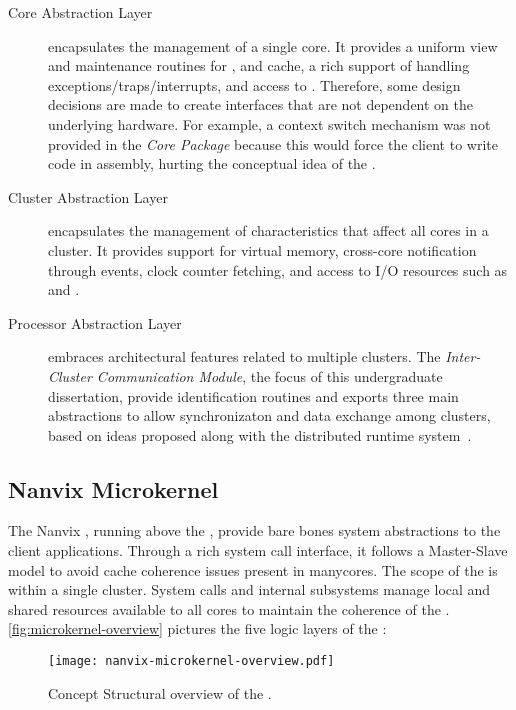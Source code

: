 		\begin{description}

			\item[Core Abstraction Layer]
				encapsulates the management of a single core.
				It provides a uniform view and maintenance routines for \tlbs, \mmu and cache,
				a rich support of handling exceptions/traps/interrupts, and
				access to \pmio.
				Therefore, some design decisions are made to create interfaces that are not
				dependent on the underlying hardware.
				For example, a context switch mechanism was not provided in the
				\textit{Core Package} because this would force the client \os
				to write code in assembly, hurting the conceptual idea of the \hal.

			\item[Cluster Abstraction Layer]
				encapsulates the management of characteristics that affect all cores in a cluster.
				It provides support for virtual memory, cross-core notification through events,
				clock counter fetching, and access to I/O resources such as \mmio and \dma.

			\item[Processor Abstraction Layer]
				embraces architectural features related to multiple clusters.
				The \textit{Inter-Cluster Communication Module}, the focus of
				this undergraduate dissertation, provide \noc identification routines and
				exports three main abstractions to allow synchronizaton and data
				exchange among clusters, based on ideas proposed along with the
				\nodeos distributed runtime system~\cite{DeDinechin2013-1}.

		\end{description}

	\subsection{Nanvix Microkernel}
	\label{sec.microkernel}

		The Nanvix \microkernel, running above the \hal, provide
		bare bones system abstractions to the client applications.
		Through a rich system call interface, it follows a Master-Slave \os model
		to avoid cache coherence issues present in manycores.
		The scope of the \microkernel is within a single cluster.
		System calls and internal subsystems manage local and shared resources
		available to all cores to maintain the coherence of the \os.
		\autoref{fig:microkernel-overview} pictures the five logic layers of the \microkernel:

		\begin{figure}[!tb]
			\centering%
			\caption{Concept Structural overview of the \microkernel.}%
			\label{fig:microkernel-overview}%
			\texttt{[image: nanvix-microkernel-overview.pdf]}%
		\end{figure}

